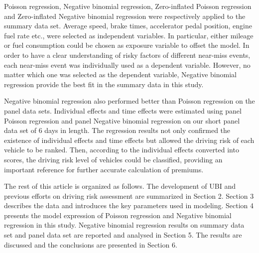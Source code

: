 \documentclass[entropy,article,submit,moreauthors,LaTeX and dvi2pdf]{Definitions/mdpi}
\begin{document}
Poisson regression, Negative binomial regression, Zero-inflated Poisson regression and Zero-inflated Negative binomial regression were respectively applied to the summary data set. Average speed, brake times, accelerator pedal position, engine fuel rate etc., were selected as independent variables\cite{sun2020assessing}. In particular, either mileage or fuel consumption could be chosen as exposure variable to offset the model. In order to have a clear understanding of risky factors of different near-miss events, each near-miss event was individually used as a dependent variable. However, no matter which one was selected as the dependent variable, Negative binomial regression provide the best fit in the summary data in this study.

Negative binomial regression also performed better than Poisson regression on the panel data sets. Individual effects and time effects were estimated using panel Poisson regression and panel Negative binomial regression on our short panel data set of 6 days in length. The regression results not only confirmed the existence of individual effects and time effects but allowed the driving risk of each vehicle to be ranked. Then, according to the individual effects converted into scores, the driving risk level of vehicles could be classified, providing an important reference for further accurate calculation of premiums.

The rest of this article is organized as follows. The development of UBI and previous efforts on driving risk assessment are summarized in Section 2. Section 3 describes the data and introduces the key parameters used in modeling. Section 4 presents the model expression of Poisson regression and Negative binomial regression in this study. Negative binomial regression results on summary data set and panel data set are reported and analysed in Section 5. The results are discussed and the conclusions are presented in Section 6.
\end{document}

